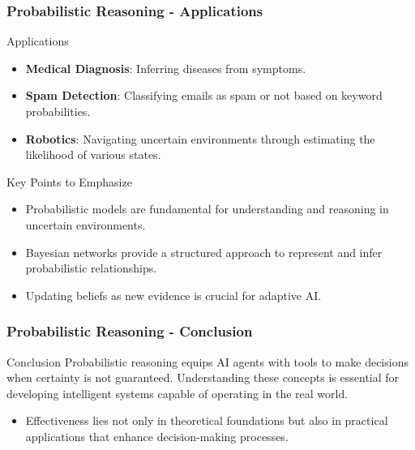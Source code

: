 \documentclass[aspectratio=169]{beamer}
\begin{document}
\begin{frame}[fragile]
    \frametitle{Probabilistic Reasoning - Applications}
    \begin{block}{Applications}
        \begin{itemize}
            \item \textbf{Medical Diagnosis}: Inferring diseases from symptoms.
            \item \textbf{Spam Detection}: Classifying emails as spam or not based on keyword probabilities.
            \item \textbf{Robotics}: Navigating uncertain environments through estimating the likelihood of various states.
        \end{itemize}
    \end{block}
    \begin{block}{Key Points to Emphasize}
        \begin{itemize}
            \item Probabilistic models are fundamental for understanding and reasoning in uncertain environments.
            \item Bayesian networks provide a structured approach to represent and infer probabilistic relationships.
            \item Updating beliefs as new evidence is crucial for adaptive AI.
        \end{itemize}
    \end{block}
\end{frame}

\begin{frame}[fragile]
    \frametitle{Probabilistic Reasoning - Conclusion}
    \begin{block}{Conclusion}
        Probabilistic reasoning equips AI agents with tools to make decisions when certainty is not guaranteed. Understanding these concepts is essential for developing intelligent systems capable of operating in the real world.
    \end{block}
    \begin{itemize}
        \item Effectiveness lies not only in theoretical foundations but also in practical applications that enhance decision-making processes.
    \end{itemize}
\end{frame}
\end{document}
